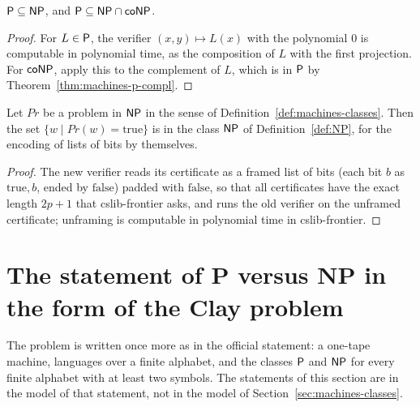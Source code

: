 \begin{theorem}
  \label{thm:machines-p-sub-np}
  \leanok
  $\mathsf{P} \subseteq \mathsf{NP}$, and $\mathsf{P} \subseteq \mathsf{NP} \cap \mathsf{coNP}$.
\end{theorem}

\begin{proof}
  \leanok
  For $L \in \mathsf{P}$, the verifier $(x, y) \mapsto L(x)$ with the polynomial $0$ is computable in polynomial
  time, as the composition of $L$ with the first projection. For $\mathsf{coNP}$, apply this to the complement
  of $L$, which is in $\mathsf{P}$ by Theorem~\ref{thm:machines-p-compl}.
\end{proof}

\begin{theorem}
  \label{thm:machines-np-cslib}
  \leanok
  Let $\mathit{Pr}$ be a problem in $\mathsf{NP}$ in the sense of Definition~\ref{def:machines-classes}. Then the
  set $\{w \mid \mathit{Pr}(w) = \mathrm{true}\}$ is in the class $\mathsf{NP}$ of Definition~\ref{def:NP}, for the
  encoding of lists of bits by themselves.
  \own{}
  \infrastructure{}
\end{theorem}

\begin{proof}
  \leanok
  The new verifier reads its certificate as a framed list of bits (each bit $b$ as $\mathrm{true}, b$,
  ended by $\mathrm{false}$) padded with $\mathrm{false}$, so that all certificates have the exact length
  $2p + 1$ that cslib-frontier asks, and runs the old verifier on the unframed certificate; unframing is
  computable in polynomial time in cslib-frontier.
\end{proof}

\section{The statement of P versus NP in the form of the Clay problem}
\label{sec:machines-cook}

The problem is written once more as in the official statement: a one-tape machine, languages over a finite
alphabet, and the classes $\mathsf{P}$ and $\mathsf{NP}$ for every finite alphabet with at least two symbols. The
statements of this section are in the model of that statement, not in the model of
Section~\ref{sec:machines-classes}.

